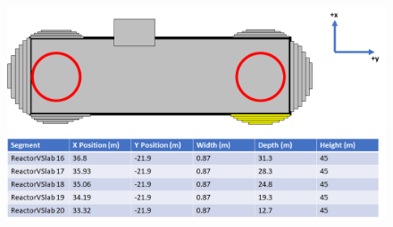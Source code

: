 \begin{figure}[htbp]
 \centering
 \includegraphics[width=\linewidth]{Chapter5/Figs/wylfaRasterNew/Slabs6.png}
 \label{fig:slabs6}
\end{figure}